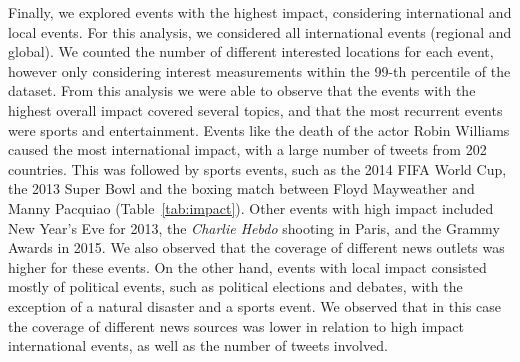 Finally, we explored events with the highest impact, considering
international and local events.  For this analysis,
we considered all international events (regional and global). We counted the
number of different interested locations for each event, however only
considering interest measurements within the 99-th percentile of the
dataset. From this analysis we were able to observe that the events with the highest overall impact
covered several topics, and that the most recurrent events were sports and entertainment.  Events
like the death of the actor Robin Williams caused the most international
impact, with a large number of tweets from 202 countries.  This was followed by sports
events, such as the 2014 FIFA World Cup, the 2013 Super Bowl and the
boxing match between Floyd Mayweather and Manny Pacquiao
(Table~\ref{tab:impact}).  Other events with high impact included New
Year's Eve for 2013, the \emph{Charlie Hebdo} shooting
in Paris, and the Grammy Awards in 2015.  We also
observed that the coverage of different news outlets was higher for
these events.  On the other hand, events with local impact consisted
mostly of political events, such as political elections and debates,
with the exception of a natural disaster and a sports event. We
observed that in this case the coverage of different news sources was
lower in relation to high impact international events, as well as the
number of tweets involved.\\